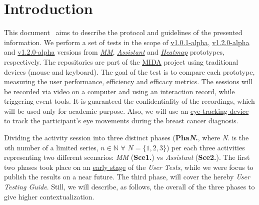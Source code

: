 
\section{Introduction}
\label{sec:sec001}

This document~\cite{francisco_maria_calisto_2019_2639038} aims to describe the protocol and guidelines of the presented information. We perform a set of tests in the scope of \hyperlink{https://github.com/MIMBCD-UI/prototype-multi-modality/releases/tag/v1.0.1-alpha}{v1.0.1-alpha}, \hyperlink{https://github.com/mida-project/prototype-multi-modality-assistant/releases/tag/v1.2.0-alpha}{v1.2.0-alpha} and \hyperlink{https://github.com/mida-project/prototype-heatmap/releases/tag/v1.2.0-alpha}{v1.2.0-alpha} versions from {\it \hyperlink{https://github.com/MIMBCD-UI/prototype-multi-modality}{{\it \gls{MM}}}}, {\it \hyperlink{https://github.com/mida-project/prototype-multi-modality-assistant}{Assistant}} and {\it \hyperlink{https://github.com/mida-project/prototype-heatmap}{Heatmap}} prototypes, respectively. The repositories are part of the \hyperlink{https://mida-project.github.io/}{MIDA} project using traditional devices (mouse and keyboard). The goal of the test is to compare each prototype, measuring the user performance, efficiency and efficacy metrics. The sessions will be recorded via video on a computer and using an interaction record, while triggering event tools. It is guaranteed the confidentiality of the recordings, which will be used only for academic purpose. Also, we will use an \hyperlink{https://gaming.tobii.com/products/}{eye-tracking device} to track the participant's eye movements during the breast cancer diagnosis.

Dividing the activity session into three distinct phases (\textbf{Pha\textit{N}.}, where \textit{N}. is the \textit{n}th number of a limited series, $n \in \mathbb{N}$ $\forall$ $N = \{1, 2, 3\}$) per each three activities representing two different scenarios: {\it \gls{MM}} (\textbf{Sce1.}) vs \textit{Assistant} (\textbf{Sce2.}). The first two phases took place on an \hyperlink{https://github.com/MIMBCD-UI/testing-guide-breast/tree/master/samples/test_4}{early stage} of the \textit{User Tests}, while we were focus to publish the results on a near future. The third phase, will cover the hereby \textit{User Testing Guide}. Still, we will describe, as follows, the overall of the three phases to give higher contextualization.

